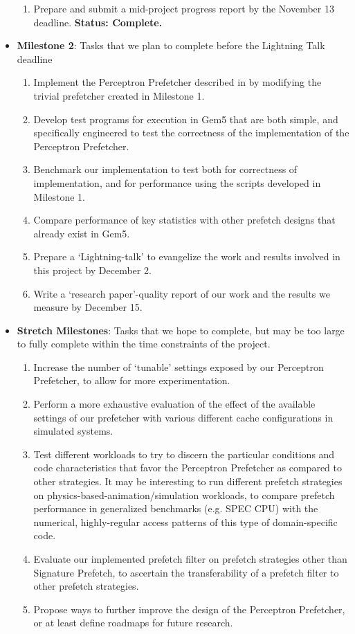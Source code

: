 \documentclass[conference]{IEEEtran}
\begin{document}
\begin{itemize}
\begin{enumerate}
    \item Prepare and submit a mid-project progress report by the November 13 deadline. \textbf{Status: Complete.}
  \end{enumerate}
\item\textbf{Milestone 2}: Tasks that we plan to complete before the Lightning Talk deadline
  \begin{enumerate}
      \item Implement the Perceptron Prefetcher described in \cite{ppf} by modifying the trivial prefetcher created in Milestone 1.
      \item Develop test programs for execution in Gem5 that are both simple, and specifically engineered to test the correctness of the implementation of the Perceptron Prefetcher.
      \item Benchmark our implementation to test both for correctness of implementation, and for performance using the scripts developed in Milestone 1.
      \item Compare performance of key statistics with other prefetch designs that already exist in Gem5.
      \item Prepare a `Lightning-talk' to evangelize the work and results involved in this project by December 2.
      \item Write a `research paper'-quality report of our work and the results we measure by December 15.
  \end{enumerate} 
\item\textbf{Stretch Milestones}: Tasks that we hope to complete, but may be too large to fully complete within the time constraints of the project.
  \begin{enumerate}
      \item Increase the number of `tunable' settings exposed by our Perceptron Prefetcher, to allow for more experimentation. 
      \item Perform a more exhaustive evaluation of the effect of the available settings of our prefetcher with various different cache configurations in simulated systems.
      \item Test different workloads to try to discern the particular conditions and code characteristics that favor the Perceptron Prefetcher as compared to other strategies. It may be interesting to run different prefetch strategies on physics-based-animation/simulation workloads, to compare prefetch performance in generalized benchmarks (e.g. SPEC CPU) with the numerical, highly-regular access patterns of this type of domain-specific code.
      \item Evaluate our implemented prefetch filter on prefetch strategies other than Signature Prefetch, to ascertain the transferability of a prefetch filter to other prefetch strategies.
      \item Propose ways to further improve the design of the Perceptron Prefetcher, or at least define roadmaps for future research.
  \end{enumerate}
\end{itemize}

\newpage


\newpage

\clearpage


\end{document}
